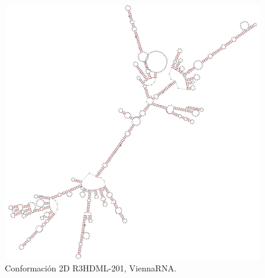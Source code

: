 \documentclass[a4paper,11pt,titlepage]{article}
\theoremstyle{definition}
\begin{document}
\begin{figure}[H]
\begin{minipage}[c]{0.45\textwidth}
        \includegraphics[width=\textwidth]{images/R3HDML-201-db_vrna.png}
        \caption{Conformación 2D R3HDML-201, ViennaRNA.}
        \label{fig:R3HDML-201-vrna}
    \end{minipage}
\end{figure}
\end{document}
